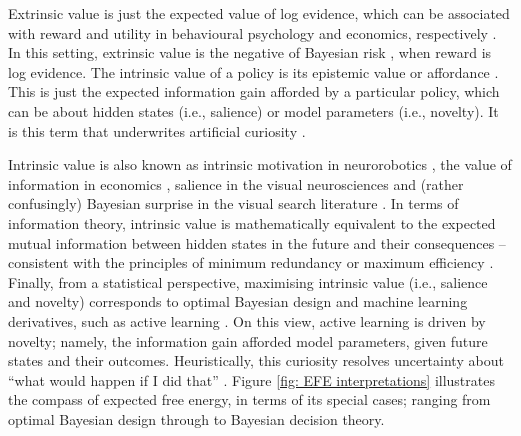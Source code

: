 \documentclass[review,12pt,authoryear]{elsarticle}
\begin{document}
Extrinsic value is just the expected value of log evidence, which can be associated with reward and utility in behavioural psychology and economics, respectively \citep{bartoNoveltySurprise2013,kauderGenesisMarginalUtility1953,schmidhuberFormalTheoryCreativity2010}. In this setting, extrinsic value is the negative of Bayesian risk \citep{bergerStatisticalDecisionTheory1985}, when reward is log evidence. The intrinsic value of a policy is its epistemic value or affordance \citep{fristonActiveInferenceEpistemic2015}. This is just the expected information gain afforded by a particular policy, which can be about hidden states (i.e., salience) or model parameters (i.e., novelty). It is this term that underwrites artificial curiosity \citep{schmidhuberDevelopmentalRoboticsOptimal2006}.

Intrinsic value is also known as intrinsic motivation in neurorobotics \citep{bartoNoveltySurprise2013,oudeyerWhatIntrinsicMotivation2009,deciIntrinsicMotivationSelfDetermination1985}, the value of information in economics \citep{howardInformationValueTheory1966}, salience in the visual neurosciences and (rather confusingly) Bayesian surprise in the visual search literature \citep{ittiBayesianSurpriseAttracts2009,schwartenbeckExplorationNoveltySurprise2013,sunPlanningBeSurprised2011}. In terms of information theory, intrinsic value is mathematically equivalent to the expected mutual information between hidden states in the future and their consequences – consistent with the principles of minimum redundancy or maximum efficiency \citep{barlowPossiblePrinciplesUnderlying1961,barlowInductiveInferenceCoding1974,linskerPerceptualNeuralOrganization1990}. Finally, from a statistical perspective, maximising intrinsic value (i.e., salience and novelty) corresponds to optimal Bayesian design \citep{lindleyMeasureInformationProvided1956} and machine learning derivatives, such as active learning \citep{mackayInformationBasedObjectiveFunctions1992}. On this view, active learning is driven by novelty; namely, the information gain afforded model parameters, given future states and their outcomes. Heuristically, this curiosity resolves uncertainty about “what would happen if I did that” \citep{schmidhuberFormalTheoryCreativity2010}. Figure \ref{fig: EFE interpretations} illustrates the compass of expected free energy, in terms of its special cases; ranging from optimal Bayesian design through to Bayesian decision theory.
\end{document}

